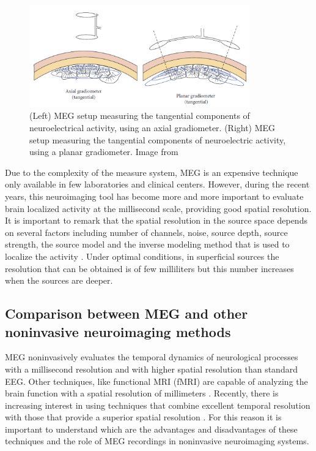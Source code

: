 \begin{figure}[ht]
\centering
\includegraphics[width=0.85\textwidth]{Images/axialPlanarGradiometer.PNG}
\caption{(Left) MEG setup measuring the tangential components of neuroelectrical activity, using an axial gradiometer. (Right) MEG setup measuring the tangential components of neuroelectric activity, using a planar gradiometer. Image from \citep{Wendel2009}}
\label{fig:gradiometers}
\end{figure}      

Due to the complexity of the measure system, MEG is an expensive technique only available in few laboratories and clinical centers. However, during the recent years, this neuroimaging tool has become more and more important to evaluate brain localized activity at the millisecond scale, providing good spatial resolution. It is important to remark that the spatial resolution in the source space  depends on several factors including number of channels, noise, source depth, source strength, the source model and the inverse modeling method that is used to localize the activity \citep{Harti1988}. Under optimal conditions, in superficial sources the resolution that can be obtained is of few milliliters but this number increases when the sources are deeper. 

          \subsection{Comparison between MEG and other noninvasive neuroimaging methods}
         
MEG noninvasively evaluates the temporal dynamics of neurological processes with a millisecond resolution and with higher spatial resolution than standard EEG. Other techniques, like functional MRI (fMRI) are capable of analyzing the brain function with a spatial resolution of millimeters \citep{Liu2006}. Recently, there is increasing interest in using techniques that combine excellent temporal resolution with those that provide a superior spatial resolution \citep{Liu2015}. For this reason it is important to understand which are the advantages and disadvantages of these techniques and the role of MEG recordings in noninvasive neuroimaging systems. 
          
